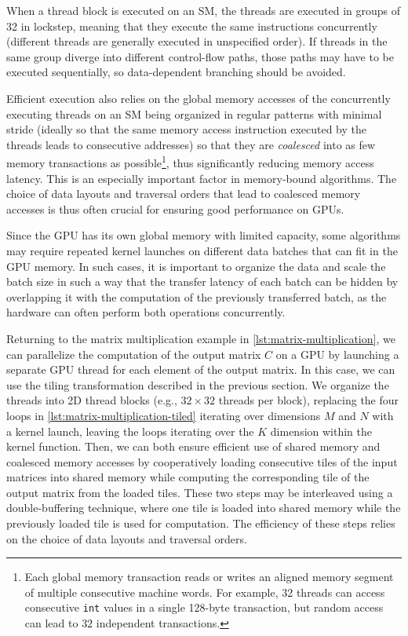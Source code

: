 When a thread block is executed on an SM, the threads are executed in groups of 32 in lockstep, meaning that they execute the same instructions concurrently (different threads are generally executed in unspecified order). If threads in the same group diverge into different control-flow paths, those paths may have to be executed sequentially, so data-dependent branching should be avoided.

Efficient execution also relies on the global memory accesses of the concurrently executing threads on an SM being organized in regular patterns with minimal stride (ideally so that the same memory access instruction executed by the threads leads to consecutive addresses) so that they are \emph{coalesced} into as few memory transactions as possible\footnote{Each global memory transaction reads or writes an aligned memory segment of multiple consecutive machine words. For example, 32 threads can access consecutive \lstinline{int} values in a single 128-byte transaction, but random access can lead to $32$ independent transactions.}, thus significantly reducing memory access latency. This is an especially important factor in memory-bound algorithms. The choice of data layouts and traversal orders that lead to coalesced memory accesses is thus often crucial for ensuring good performance on GPUs.

Since the GPU has its own global memory with limited capacity, some algorithms may require repeated kernel launches on different data batches that can fit in the GPU memory. In such cases, it is important to organize the data and scale the batch size in such a way that the transfer latency of each batch can be hidden by overlapping it with the computation of the previously transferred batch, as the hardware can often perform both operations concurrently.

Returning to the matrix multiplication example in \cref{lst:matrix-multiplication}, we can parallelize the computation of the output matrix $C$ on a GPU by launching a separate GPU thread for each element of the output matrix. In this case, we can use the tiling transformation described in the previous section. We organize the threads into 2D thread blocks (e.g., $32 \times 32$ threads per block), replacing the four loops in \cref{lst:matrix-multiplication-tiled} iterating over dimensions $M$ and $N$ with a kernel launch, leaving the loops iterating over the $K$ dimension within the kernel function. Then, we can both ensure efficient use of shared memory and coalesced memory accesses by cooperatively loading consecutive tiles of the input matrices into shared memory while computing the corresponding tile of the output matrix from the loaded tiles. These two steps may be interleaved using a double-buffering technique, where one tile is loaded into shared memory while the previously loaded tile is used for computation. The efficiency of these steps relies on the choice of data layouts and traversal orders.

